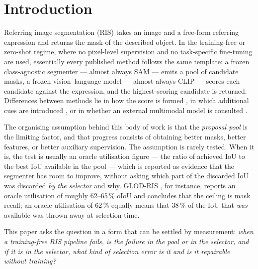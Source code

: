 \section{Introduction}

Referring image segmentation (RIS) takes an image and a free-form referring
expression and returns the mask of the described object. In the training-free
or zero-shot regime, where no pixel-level supervision and no task-specific
fine-tuning are used, essentially every published method follows the same
template: a frozen class-agnostic segmenter --- almost always SAM
\cite{kirillov2023sam} --- emits a pool of candidate masks, a frozen
vision--language model --- almost always CLIP \cite{radford2021clip} --- scores
each candidate against the expression, and the highest-scoring candidate is
returned. Differences between methods lie in how the score is formed
\cite{yu2023global,liu2025hybridgl,wu2026glodris}, in which additional cues are
introduced \cite{kim2023refdiff,li2023tas}, or in whether an external
multimodal model is consulted \cite{li2025lgd}.

The organising assumption behind this body of work is that the \emph{proposal
pool} is the limiting factor, and that progress consists of obtaining better
masks, better features, or better auxiliary supervision. The assumption is
rarely tested. When it is, the test is usually an oracle utilisation figure ---
the ratio of achieved IoU to the best IoU available in the pool --- which is
reported as evidence that the segmenter has room to improve, without asking
which part of the discarded IoU was discarded \emph{by the selector} and why.
GLOD-RIS \cite{wu2026glodris}, for instance, reports an oracle utilisation of
roughly 62--65\,\% oIoU and concludes that the ceiling is mask recall; an
oracle utilisation of 62\,\% equally means that 38\,\% of the IoU that
\emph{was} available was thrown away at selection time.

This paper asks the question in a form that can be settled by measurement:
\emph{when a training-free RIS pipeline fails, is the failure in the pool or in
the selector, and if it is in the selector, what kind of selection error is it
and is it repairable without training?}

